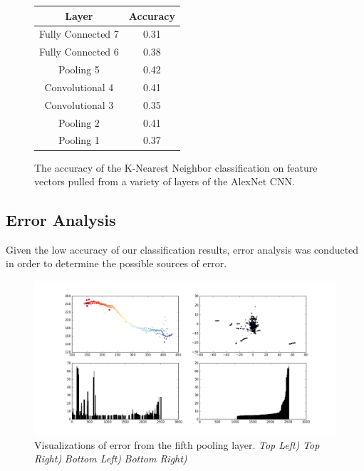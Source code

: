 \documentclass[letterpaper, 12 pt, conference]{ieeeconf}  %
\begin{document}
\begin{figure}[h]
\centering
\begin{tabular}{| c | c |}
\hline
\textbf{Layer} & \textbf{Accuracy} \\
\hline
Fully Connected 7 & 0.31 \\ 
Fully Connected 6 & 0.38 \\
Pooling 5 & 0.42 \\
Convolutional 4 & 0.41 \\
Convolutional 3 & 0.35 \\
Pooling 2 & 0.41 \\
Pooling 1 & 0.37 \\
\hline
\end{tabular}
\caption{The accuracy of the K-Nearest Neighbor classification on feature vectors pulled from a variety of layers of the AlexNet CNN. }
\label{classification_results}
\end{figure} 

\subsection{Error Analysis}

Given the low accuracy of our classification results, error analysis was conducted in order to determine the possible sources of error. 

\begin{figure}[h]
\centering
\includegraphics[scale=0.25]{error_pool5}
\caption{Visualizations of error from the fifth pooling layer. \textit{Top Left)} \textit{Top Right)} \textit{Bottom Left)} \textit{Bottom Right)}}
\label{error_graphs}
\end{figure}
\end{document}
